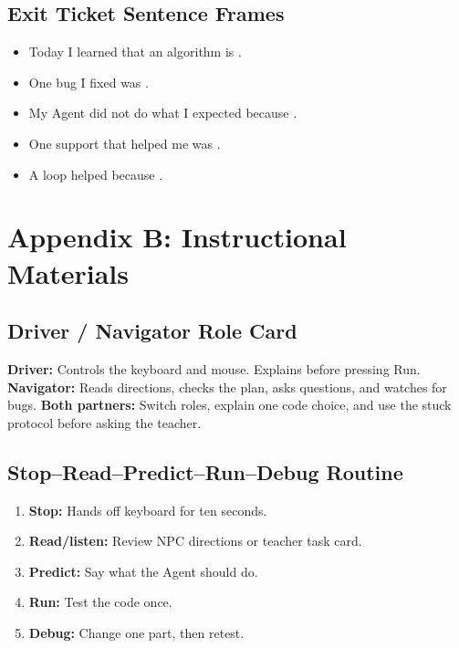\documentclass[12pt]{article}
\begin{document}
\newpage
\subsection{Exit Ticket Sentence Frames}

\begin{itemize}
\item Today I learned that an algorithm is \underline{\hspace{2.5in}}.
\item One bug I fixed was \underline{\hspace{2.5in}}.
\item My Agent did not do what I expected because \underline{\hspace{2.1in}}.
\item One support that helped me was \underline{\hspace{2.3in}}.
\item A loop helped because \underline{\hspace{2.7in}}.
\end{itemize}

\section{Appendix B: Instructional Materials}

\subsection{Driver / Navigator Role Card}

\textbf{Driver:} Controls the keyboard and mouse. Explains before pressing Run.  
\textbf{Navigator:} Reads directions, checks the plan, asks questions, and watches for bugs.  
\textbf{Both partners:} Switch roles, explain one code choice, and use the stuck protocol before asking the teacher.

\subsection{Stop--Read--Predict--Run--Debug Routine}

\begin{enumerate}
\item \textbf{Stop:} Hands off keyboard for ten seconds.
\item \textbf{Read/listen:} Review NPC directions or teacher task card.
\item \textbf{Predict:} Say what the Agent should do.
\item \textbf{Run:} Test the code once.
\item \textbf{Debug:} Change one part, then retest.
\end{enumerate}
\end{document}
